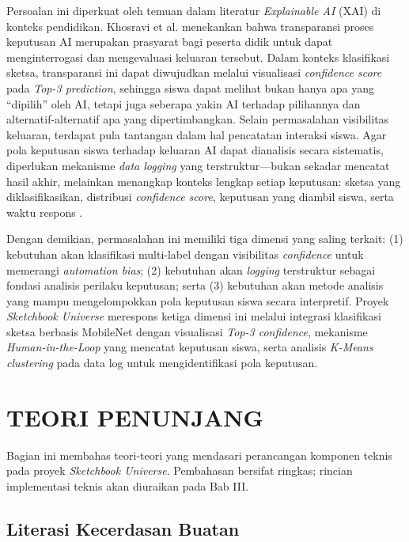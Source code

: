 \documentclass[12pt,a4paper,oneside,openany]{report}
\begin{document}
Persoalan ini diperkuat oleh temuan dalam literatur \textit{Explainable AI} (XAI) di konteks pendidikan. Khosravi et al. \cite{ref3} menekankan bahwa transparansi proses keputusan AI merupakan prasyarat bagi peserta didik untuk dapat menginterrogasi dan mengevaluasi keluaran tersebut. Dalam konteks klasifikasi sketsa, transparansi ini dapat diwujudkan melalui visualisasi \textit{confidence score} pada \textit{Top-3 prediction}, sehingga siswa dapat melihat bukan hanya apa yang ``dipilih'' oleh AI, tetapi juga seberapa yakin AI terhadap pilihannya dan alternatif-alternatif apa yang dipertimbangkan. Selain permasalahan visibilitas keluaran, terdapat pula tantangan dalam hal pencatatan interaksi siswa. Agar pola keputusan siswa terhadap keluaran AI dapat dianalisis secara sistematis, diperlukan mekanisme \textit{data logging} yang terstruktur---bukan sekadar mencatat hasil akhir, melainkan menangkap konteks lengkap setiap keputusan: sketsa yang diklasifikasikan, distribusi \textit{confidence score}, keputusan yang diambil siswa, serta waktu respons \cite{ref5}\cite{ref10}.

Dengan demikian, permasalahan ini memiliki tiga dimensi yang saling terkait: (1) kebutuhan akan klasifikasi multi-label dengan visibilitas \textit{confidence} untuk memerangi \textit{automation bias}; (2) kebutuhan akan \textit{logging} terstruktur sebagai fondasi analisis perilaku keputusan; serta (3) kebutuhan akan metode analisis yang mampu mengelompokkan pola keputusan siswa secara interpretif. Proyek \textit{Sketchbook Universe} merespons ketiga dimensi ini melalui integrasi klasifikasi sketsa berbasis MobileNet dengan visualisasi \textit{Top-3 confidence}, mekanisme \textit{Human-in-the-Loop} yang mencatat keputusan siswa, serta analisis \textit{K-Means clustering} pada data log untuk mengidentifikasi pola keputusan.

\section{TEORI PENUNJANG}
\label{sec:teori-penunjang}

Bagian ini membahas teori-teori yang mendasari perancangan komponen teknis pada proyek \textit{Sketchbook Universe}. Pembahasan bersifat ringkas; rincian implementasi teknis akan diuraikan pada Bab III.

\subsection{Literasi Kecerdasan Buatan}
\label{subsec:literasi-kb}
\end{document}
